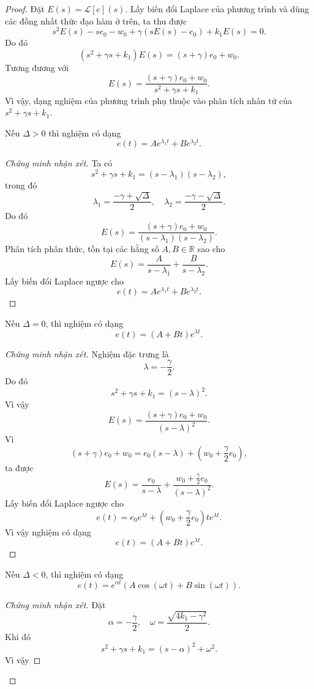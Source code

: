 ﻿\documentclass[12pt]{article}
\begin{document}
\begin{proof}
Đặt $E(s) = \mathcal L[e](s)$. Lấy biến đổi Laplace của phương trình và dùng các đồng nhất thức đạo hàm ở trên, ta thu được
\[
 s^2E(s) - se_0 - w_0 + \gamma(sE(s) - e_0) + k_1E(s) = 0.
\]
Do đó
\[
 (s^2 + \gamma s + k_1)E(s) = (s + \gamma)e_0 + w_0.
\]
Tương đương với
\[
 E(s) = \frac{(s + \gamma)e_0 + w_0}{s^2 + \gamma s + k_1}.
\]
Vì vậy, dạng nghiệm của phương trình phụ thuộc vào phân tích nhân tử của $s^2 + \gamma s + k_1$.
\begin{claim}
Nếu $\Delta > 0$ thì nghiệm có dạng
\[
 e(t) = Ae^{\lambda_1t} + Be^{\lambda_2t}.
\]
\end{claim}
\begin{proof}[Chứng minh nhận xét]
Ta có 
\[
 s^2 + \gamma s + k_1 = (s - \lambda_1)(s - \lambda_2),
\]
trong đó
\[
 \lambda_1 = \frac{-\gamma + \sqrt{\Delta}}2,
 \quad
 \lambda_2 = \frac{-\gamma - \sqrt{\Delta}}2.
\]
Do đó
\[
 E(s)
 =
 \frac{(s + \gamma)e_0 + w_0}{(s - \lambda_1)(s - \lambda_2)}.
\]
Phân tích phân thức, tồn tại các hằng số $A, B \in \mathbb R$ sao cho
\[
 E(s) = \frac{A}{s - \lambda_1} + \frac{B}{s - \lambda_2}.
\]
Lấy biến đổi Laplace ngược cho
\[
 e(t) = Ae^{\lambda_1t} + Be^{\lambda_2t}.
\]
\end{proof}
\begin{claim}
Nếu $\Delta = 0$, thì nghiệm có dạng
\[
 e(t) = (A + Bt)e^{\lambda t}.
\]
\end{claim}
\begin{proof}[Chứng minh nhận xét]
Nghiệm đặc trưng là
\[
 \lambda = -\frac{\gamma}{2}.
\]
Do đó
\[
 s^2 + \gamma s + k_1 = (s - \lambda)^2.
\]
Vì vậy
\[
 E(s) = \frac{(s + \gamma)e_0 + w_0}{(s - \lambda)^2}.
\]
Vì
\[
 (s + \gamma)e_0 + w_0
 =
 e_0(s - \lambda)
 +
 \left(w_0 + \frac{\gamma}{2}e_0\right),
\]
ta được
\[
 E(s)
 =
 \frac{e_0}{s - \lambda}
 +
 \frac{w_0 + \frac{\gamma}{2}e_0}{(s - \lambda)^2}.
\]
Lấy biến đổi Laplace ngược cho
\[
 e(t)
 =
 e_0e^{\lambda t}
 +
 \left(w_0 + \frac{\gamma}{2}e_0\right)te^{\lambda t}.
\]
Vì vậy nghiệm có dạng
\[
 e(t) = (A + Bt)e^{\lambda t}.
\]
\end{proof}
\begin{claim}
Nếu $\Delta < 0$, thì nghiệm có dạng
\[
 e(t) = e^{\alpha t}\left(A\cos(\omega t) + B\sin(\omega t)\right).
\]
\end{claim}
\begin{proof}[Chứng minh nhận xét]
Đặt
\[
 \alpha = -\frac{\gamma}{2},
 \quad
 \omega = \frac{\sqrt{4k_1 - \gamma^2}}2.
\]
Khi đó
\[
 s^2 + \gamma s + k_1 = (s - \alpha)^2 + \omega^2.
\]
Vì vậy

\end{proof}
\end{proof}
\end{document}
